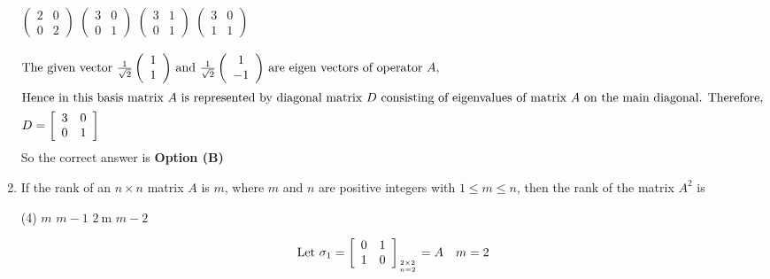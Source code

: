 \begin{enumerate}[label=\color{ocre}\textbf{\arabic*.}]
\begin{tasks}
		\task[\textbf{A.}] $\left(\begin{array}{ll}2 & 0 \\ 0 & 2\end{array}\right)$
		\task[\textbf{B.}] $\left(\begin{array}{ll}3 & 0 \\ 0 & 1\end{array}\right)$
		\task[\textbf{C.}] $\left(\begin{array}{ll}3 & 1 \\ 0 & 1\end{array}\right)$
		\task[\textbf{D.}] $\left(\begin{array}{ll}3 & 0 \\ 1 & 1\end{array}\right)$
	\end{tasks}
	\begin{answer}
		\begin{align*}
		\intertext{The given vector $\frac{1}{\sqrt{2}}\left(\begin{array}{l}1 \\ 1\end{array}\right)$ and $\frac{1}{\sqrt{2}}\left(\begin{array}{c}1 \\ -1\end{array}\right)$ are eigen vectors of operator $A$,}
		\intertext{Hence in this basis matrix $A$ is represented by diagonal matrix $D$ consisting of eigenvalues of matrix $A$ on the main diagonal. Therefore,}
		D&=\left[\begin{array}{ll}3 & 0 \\ 0 & 1\end{array}\right]
		\end{align*}
		So the correct answer is \textbf{Option (B)}
	\end{answer}
	\item  If the rank of an $n \times n$ matrix $A$ is $m$, where $m$ and $n$ are positive integers with $1 \leq m \leq n$, then the rank of the matrix $A^{2}$ is
	{}
	\begin{tasks}(4)
		\task[\textbf{A.}]  $m$
		\task[\textbf{B.}] $m-1$
		\task[\textbf{C.}] $2 \mathrm{~m}$
		\task[\textbf{D.}] $m-2$
	\end{tasks}
	\begin{answer}
		\begin{align*}
		\text{	Let }\sigma_{1}&=\left[\begin{array}{ll}0 & 1 \\ 1 & 0\end{array}\right]_{2 \times 2 \atop n=2}=A \quad m=2\\

\end{align*}
\end{answer}
\end{enumerate}
